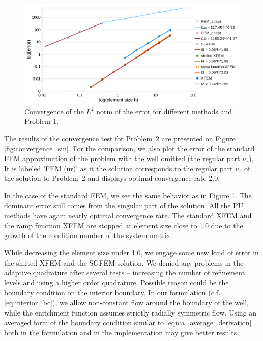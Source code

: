 \documentclass{elsarticle}
\newcommand{\prob}[1]{Problem~{#1}}
\newcommand{\fig}[1]{\hyperref[#1]{Figure \ref{#1}}}
\begin{document}
\begin{figure}[!htb]
  \centering    
  \includegraphics[width=\textwidth]{results/convergence.pdf}
  \caption[Convergence graph \prob{1}]{Convergence of the $L^2$ norm of the error for different methods and Problem 1.}
  \label{fig:convergence}
\end{figure}


The results of the convergence test for \prob{2} are presented on \fig{fig:convergence_sin}.
For the comparison, we also plot the error of the standard FEM approximation of the problem with the well omitted (the regular part $u_r$), 
It is labeled 'FEM (ur)' as it the solution corresponds to the regular part $u_r$ of the solution to \prob{2} and displays optimal convergence rate 2.0.

In the case of the standard FEM, we see the same behavior as in \fig{fig:convergence}. The dominant error still 
comes from the singular part of the solution. All the PU methods have again nearly optimal convergence rate. 
The standard XFEM and the ramp function XFEM
are stopped at element size close to 1.0 due to the growth of the condition number of the system matrix.

While decreasing the element size under 1.0, we engage some new kind of error in the shifted XFEM and the 
SGFEM solution. We denied any problems in the adaptive quadrature after several tests -- increasing the number
of refinement levels and using a higher order quadrature. Possible reason could be the boundary condition 
on the interior boundary. In our formulation (c.f. \eqref{eq:interior_bc}), we allow non-constant flow around the boundary
of the well, while the enrichment function assumes strictly radially symmetric flow. Using an averaged form of the boundary 
condition similar to \eqref{eqn:a_average_derivation} both in the formulation and in the implementation may give better results.
\end{document}
